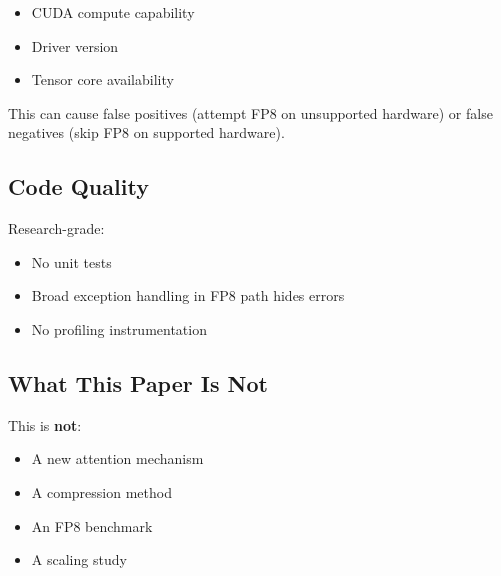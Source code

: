 \begin{itemize}
\item CUDA compute capability
\item Driver version
\item Tensor core availability

\end{itemize}
This can cause false positives (attempt FP8 on unsupported hardware) or 
false negatives (skip FP8 on supported hardware).

\subsection{Code Quality}

Research-grade:

\begin{itemize}
\item No unit tests
\item Broad exception handling in FP8 path hides errors
\item No profiling instrumentation

\end{itemize}
\subsection{What This Paper Is Not}

This is \textbf{not}:

\begin{itemize}
\item A new attention mechanism
\item A compression method
\item An FP8 benchmark
\item A scaling study

\end{itemize}
